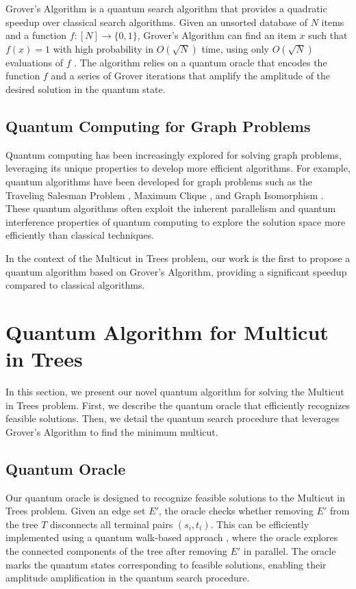 Grover's Algorithm is a quantum search algorithm that provides a quadratic speedup over classical search algorithms. Given an unsorted database of $N$ items and a function $f : [N] \rightarrow \{0, 1\}$, Grover's Algorithm can find an item $x$ such that $f(x) = 1$ with high probability in $O(\sqrt{N})$ time, using only $O(\sqrt{N})$ evaluations of $f$ \cite{grover1996fast}. The algorithm relies on a quantum oracle that encodes the function $f$ and a series of Grover iterations that amplify the amplitude of the desired solution in the quantum state.

\subsection{Quantum Computing for Graph Problems}

Quantum computing has been increasingly explored for solving graph problems, leveraging its unique properties to develop more efficient algorithms. For example, quantum algorithms have been developed for graph problems such as the Traveling Salesman Problem \cite{paparo2013google}, Maximum Clique \cite{childs2007quantum}, and Graph Isomorphism \cite{wang2010quantum}. These quantum algorithms often exploit the inherent parallelism and quantum interference properties of quantum computing to explore the solution space more efficiently than classical techniques.

In the context of the Multicut in Trees problem, our work is the first to propose a quantum algorithm based on Grover's Algorithm, providing a significant speedup compared to classical algorithms.

\section{Quantum Algorithm for Multicut in Trees}
\label{sec:algorithm}

In this section, we present our novel quantum algorithm for solving the Multicut in Trees problem. First, we describe the quantum oracle that efficiently recognizes feasible solutions. Then, we detail the quantum search procedure that leverages Grover's Algorithm to find the minimum multicut.

\subsection{Quantum Oracle}

Our quantum oracle is designed to recognize feasible solutions to the Multicut in Trees problem. Given an edge set $E'$, the oracle checks whether removing $E'$ from the tree $T$ disconnects all terminal pairs $(s_i, t_i)$. This can be efficiently implemented using a quantum walk-based approach \cite{childs2013universal}, where the oracle explores the connected components of the tree after removing $E'$ in parallel. The oracle marks the quantum states corresponding to feasible solutions, enabling their amplitude amplification in the quantum search procedure.

